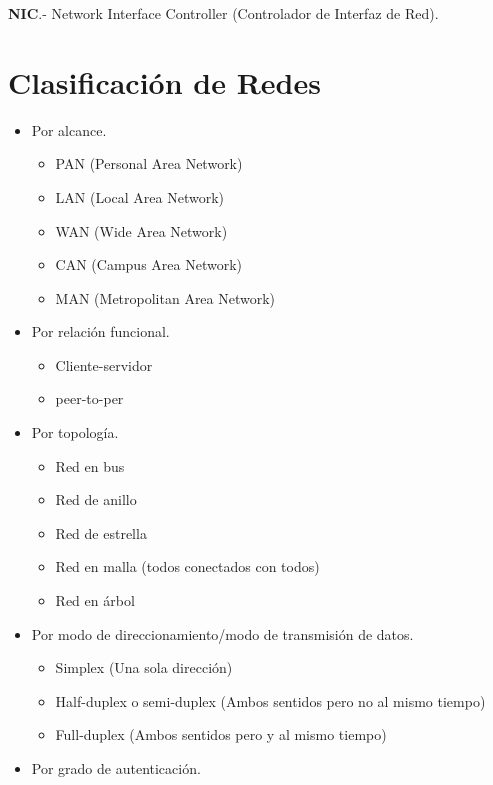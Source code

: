 \documentclass{article}
\begin{document}
\textbf{NIC}.- Network Interface Controller (Controlador de Interfaz de Red).

\section{Clasificación de Redes}

\begin{itemize}
	\item
		Por alcance.

		\begin{itemize}
			\item
			PAN (Personal Area Network)
			\item
			LAN (Local Area Network)
			\item
			WAN (Wide Area Network)
			\item
			CAN (Campus Area Network)
			\item
			MAN (Metropolitan Area Network)
		\end{itemize}
	\item
		Por relación funcional.

		\begin{itemize}
			\item
			Cliente-servidor
			\item
			peer-to-per
		\end{itemize}
	\item
		Por topología.

		\begin{itemize}
			\item
			Red en bus
			\item
			Red de anillo
			\item
			Red de estrella
			\item
			Red en malla (todos conectados con todos)
			\item
			Red en árbol
		\end{itemize}
	\item
		Por modo de direccionamiento/modo de transmisión de datos.

		\begin{itemize}
			\item
			Simplex (Una sola dirección)
			\item
			Half-duplex o semi-duplex (Ambos sentidos pero
			no al mismo tiempo)
			\item
			Full-duplex (Ambos sentidos pero y al mismo tiempo)
		\end{itemize}
	\item
		Por grado de autenticación.


\end{itemize}
\end{document}
